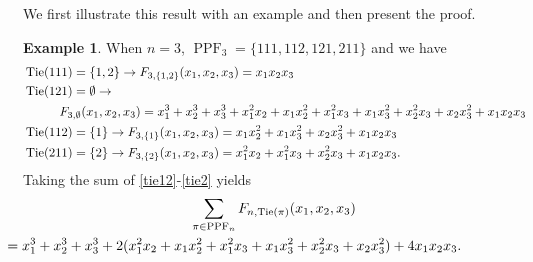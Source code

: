 \documentclass[12pt,reqno]{amsart}
\theoremstyle{definition}
\newtheorem{example}{Example}
\theoremstyle{remark}
\DeclareMathOperator{\PPF}{PPF}
\DeclareMathOperator{\Tie}{Tie}
\begin{document}
We first illustrate this result with an example and then present the proof.



\begin{example}
When $n=3$, $\PPF_3=\{111,112,121,211\}$ and we have 
\begin{align}
    &\Tie(111)=\{1,2\}\rightarrow F_{3,\{1,2\}}(x_1, x_2, x_3)=x_1x_2x_3\label{tie12}\\
     &\Tie(121)=\emptyset\rightarrow \notag \\ &\hspace{1cm} F_{3,\emptyset}(x_1, x_2, x_3)=x_1^3+x_2^3+x_3^3+x_1^2x_2+x_1x_2^2+x_1^2x_3+x_1x_3^2+x_2^2x_3+x_2x_3^2+x_1x_2x_3\label{tiempty}\\
    &\Tie(112)=\{1\}\rightarrow F_{3,\{1\}}(x_1, x_2, x_3)=x_1x_2^2+x_1x_3^2+x_2x_3^2+x_1x_2x_3\label{tie1}\\
    &\Tie(211)=\{2\}\rightarrow F_{3,\{2\}}(x_1, x_2, x_3)=x_1^2x_2+x_1^2x_3+x_2^2x_3+x_1x_2x_3.\label{tie2}
\end{align}
Taking the sum of \eqref{tie12}-\eqref{tie2} yields
\begin{multline}
\label{eqLHS}
\sum_{\pi\in\PPF_n}F_{n,\Tie(\pi)} (x_1, x_2, x_3)%
\\
\hspace{-2cm}=x_1^3+x_2^3+x_3^3+2(x_1^2x_2+x_1x_2^2+x_1^2x_3+x_1x_3^2+x_2^2x_3+x_2x_3^2)+4x_1x_2x_3.
\end{multline}


\end{example}
\end{document}
